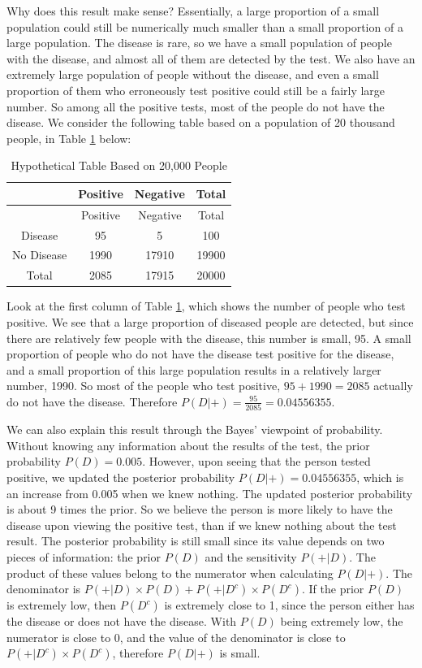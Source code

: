 \documentclass[
]{book}
\begin{document}
Why does this result make sense? Essentially, a large proportion of a small population could still be numerically much smaller than a small proportion of a large population. The disease is rare, so we have a small population of people with the disease, and almost all of them are detected by the test. We also have an extremely large population of people without the disease, and even a small proportion of them who erroneously test positive could still be a fairly large number. So among all the positive tests, most of the people do not have the disease. We consider the following table based on a population of 20 thousand people, in Table \ref{tab:disease} below:

\begin{longtable}[]{@{}cccc@{}}
\caption{\label{tab:disease} Hypothetical Table Based on 20,000 People}\tabularnewline
\toprule\noalign{}
& Positive & Negative & Total \\
\midrule\noalign{}
\endfirsthead
\toprule\noalign{}
& Positive & Negative & Total \\
\midrule\noalign{}
\endhead
\bottomrule\noalign{}
\endlastfoot
Disease & 95 & 5 & 100 \\
No Disease & 1990 & 17910 & 19900 \\
Total & 2085 & 17915 & 20000 \\
\end{longtable}

Look at the first column of Table \ref{tab:disease}, which shows the number of people who test positive. We see that a large proportion of diseased people are detected, but since there are relatively few people with the disease, this number is small, 95. A small proportion of people who do not have the disease test positive for the disease, and a small proportion of this large population results in a relatively larger number, 1990. So most of the people who test positive, \(95 + 1990 = 2085\) actually do not have the disease. Therefore \(P(D|+) = \frac{95}{2085} = 0.04556355\).

We can also explain this result through the Bayes' viewpoint of probability. Without knowing any information about the results of the test, the prior probability \(P(D) = 0.005\). However, upon seeing that the person tested positive, we updated the posterior probability \(P(D|+) = 0.04556355\), which is an increase from 0.005 when we knew nothing. The updated posterior probability is about 9 times the prior. So we believe the person is more likely to have the disease upon viewing the positive test, than if we knew nothing about the test result. The posterior probability is still small since its value depends on two pieces of information: the prior \(P(D)\) and the sensitivity \(P(+|D)\). The product of these values belong to the numerator when calculating \(P(D|+)\). The denominator is \(P(+|D) \times P(D) + P(+|D^c) \times P(D^c)\). If the prior \(P(D)\) is extremely low, then \(P(D^c)\) is extremely close to 1, since the person either has the disease or does not have the disease. With \(P(D)\) being extremely low, the numerator is close to 0, and the value of the denominator is close to \(P(+|D^c) \times P(D^c)\), therefore \(P(D|+)\) is small.
\end{document}
